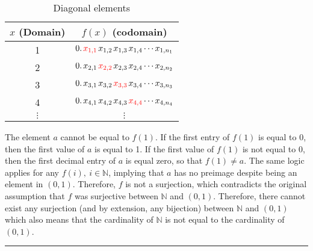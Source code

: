 \documentclass{article}
\begin{document}
\begin{table}[h!]\begin{center}
\begin{tabular}{c|c}
	$x$ (Domain) & $f(x)$ (codomain) \\ \hline
	1 & $ 0.\hspace{0.02in} \textcolor{red}{x_{1,1}} \hspace{0.02in} x_{1,2} \hspace{0.02in} x_{1,3}\hspace{0.02in}x_{1,4}\cdots x_{1,n_1}$ \\
	2 & $ 0.\hspace{0.02in} x_{2,1} \hspace{0.02in} \textcolor{red}{x_{2,2}} \hspace{0.02in} x_{2,3}\hspace{0.02in}x_{2,4}\cdots x_{2,n_2}$ \\
	3 & $ 0.\hspace{0.02in} x_{3,1} \hspace{0.02in} x_{3,2} \hspace{0.02in} \textcolor{red}{x_{3,3}}\hspace{0.02in}x_{3,4}\cdots x_{3,n_3}$ \\
	4 & $ 0.\hspace{0.02in} x_{4,1} \hspace{0.02in} x_{4,2} \hspace{0.02in} x_{4,3}\hspace{0.02in}\textcolor{red}{x_{4,4}}\cdots x_{4,n_4}$ \\
	$\vdots$ & $\vdots$ \\
\end{tabular}\end{center}
\caption{Diagonal elements}
\label{tab:question2:diag}
\end{table}
The element $a$ cannot be equal to $f(1)$. If the first entry of $f(1)$ is equal to $0$, then the first value of $a$ is equal to 1.  If the first value of $f(1)$ is not equal to 0, then the first decimal entry of $a$ is equal zero, so that $f(1) \neq a$. The same logic applies for any $f(i), \ i \in \mathbb{N}$, implying that $a$ has no preimage despite being an element in $(0,1)$.  Therefore, $f$ is not a surjection, which contradicts the original assumption that $f$ was surjective between $\mathbb{N}$ and $(0,1)$. Therefore, there cannot exist any surjection (and by extension, any bijection) between $\mathbb{N}$ and $(0,1)$ which also means that the cardinality of $\mathbb{N}$ is not equal to the cardinality of $(0,1)$. 
\\[0.05in] \noindent\rule{\textwidth}{0.4pt}\vspace{0.05in}
\end{document}
